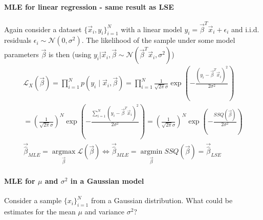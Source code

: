 \paragraph*{MLE for linear regression - same result as LSE} Again consider a dataset $\{ \vec{x}_i,y_i \}_{i=1}^N$
with a linear model $y_i = \vec{\beta}^T \vec{x}_i + \epsilon_i$ and i.i.d. residuals $\epsilon_i \sim \mathcal{N}(0,\sigma^2)$.
The likelihood of the sample under some model parameters $\vec{\beta}$ is then (using $y_i|\vec{x}_i,\vec{\beta} \sim \mathcal{N}(\vec{\beta}^T \vec{x}_i,\sigma^2)$)
\begin{equation}
    \begin{gathered}
    \mathcal{L}_X(\vec{\beta})=\prod_{i=1}^N p\left(y_i \mid \vec{x}_i,\vec{\beta}\right)=\prod_{i=1}^N \frac{1}{\sqrt{2 \pi} \sigma} \exp \left(-\frac{\left(y_i-\vec{\beta}^T \vec{x}_i\right)^2}{2 \sigma^2}\right) \\
    =\left(\frac{1}{\sqrt{2 \pi} \sigma}\right)^N \exp \left(-\frac{\sum_{i=1}^N\left(y_i-\vec{\beta}^T \vec{x}_i\right)^2}{2 \sigma^2}\right)=\left(\frac{1}{\sqrt{2 \pi} \sigma}\right)^N \exp \left(-\frac{S S Q(\vec{\beta})}{2 \sigma^2}\right) \\
    \vec{\hat{\beta}}_{M L E}=\underset{\vec{\beta}}{\operatorname{argmax}} \mathcal{L}(\vec{\beta}) \Leftrightarrow \vec{\hat{\beta}}_{M L E}=\underset{\vec{\beta}}{\operatorname{argmin}} S S Q(\vec{\beta})=\vec{\hat{\beta}}_{L S E}
    \end{gathered}
\end{equation}

\paragraph*{MLE for $\mu$ and $\sigma^2$ in a Gaussian model} Consider a sample $\{ x_i \}_{i=1}^N$ from a Gaussian distribution.
What could be estimates for the mean $\mu$ and variance $\sigma^2$?


